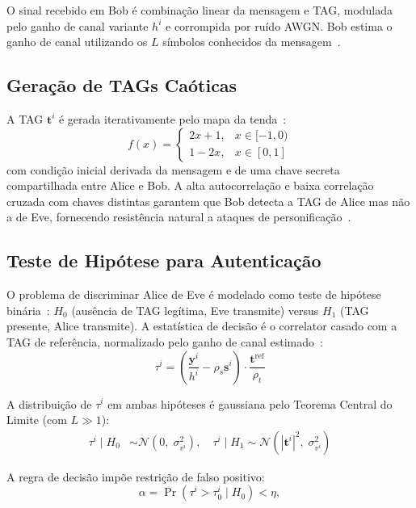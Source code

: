 \documentclass{sbrt}
\begin{document}
O sinal recebido em Bob é combinação linear da mensagem e TAG, modulada pelo ganho de canal variante $h^i$ e corrompida por ruído AWGN. Bob estima o ganho de canal utilizando os $L$ símbolos conhecidos da mensagem~\cite{ref_kay}.

\subsection{Geração de TAGs Caóticas}

A TAG $\mathbf{t}^i$ é gerada iterativamente pelo mapa da tenda~\cite{ref_joao}:
\begin{equation}\label{eq:tentmap}
    f(x) = \begin{cases} 2x+1, & x \in [-1,0) \\ 1-2x, & x \in [0,1] \end{cases}
\end{equation}
com condição inicial derivada da mensagem e de uma chave secreta compartilhada entre Alice e Bob. A alta autocorrelação e baixa correlação cruzada com chaves distintas garantem que Bob detecta a TAG de Alice mas não a de Eve, fornecendo resistência natural a ataques de personificação~\cite{ref_joao}.

\subsection{Teste de Hipótese para Autenticação}

O problema de discriminar Alice de Eve é modelado como teste de hipótese binária~\cite{ref_poor}: $H_0$ (ausência de TAG legítima, Eve transmite) versus $H_1$ (TAG presente, Alice transmite). A estatística de decisão é o correlator casado com a TAG de referência, normalizado pelo ganho de canal estimado~\cite{ref_xie}:
\begin{equation}\label{eq:tau}
    \tau^i = \left(\frac{\mathbf{y}^i}{h^i} - \rho_s \mathbf{s}^i\right) \cdot \frac{\mathbf{t}^{\mathrm{ref}}}{\rho_t}
\end{equation}

A distribuição de $\tau^i$ em ambas hipóteses é gaussiana pelo Teorema Central do Limite (com $L \gg 1$):
\begin{align}
    \tau^i \mid H_0 &\sim \mathcal{N}\!\left(0,\; \sigma_{v^i}^2\right),\quad
    \tau^i \mid H_1 \sim \mathcal{N}\!\left(|\mathbf{t}^i|^2,\; \sigma_{v^i}^2\right) \label{eq:dists}
\end{align}

A regra de decisão impõe restrição de falso positivo:
\begin{equation}\label{eq:alpha}
    \alpha = \Pr(\tau^i > \tau_0^i \mid H_0) < \eta,
\end{equation}
\end{document}
